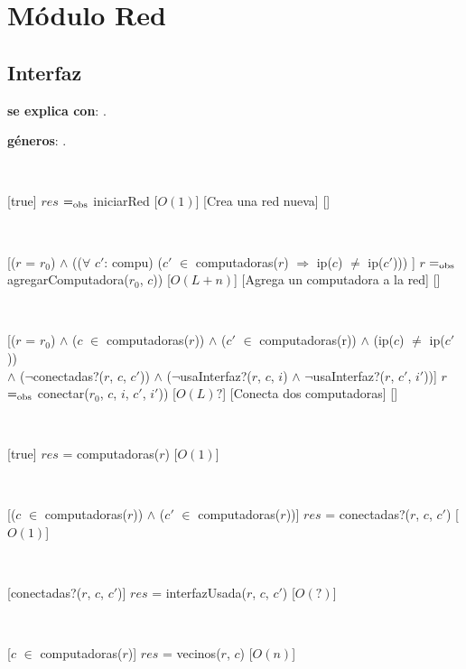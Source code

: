 \section{Módulo Red}

\subsection{Interfaz}

\textbf{se explica con}: .

\textbf{géneros}: .

  ~

  [true]
  {$res$ $=_{\mathrm{obs}}$ iniciarRed}
  [$O(1)$]
  [Crea una red nueva]
  []

  ~

  [($r$ = $r_0$) $\land$ (($\forall$ $c'$: compu) ($c'$ $\in$ computadoras($r$) $\Rightarrow$  ip($c$) $\neq$  ip($c'$)))  ]
  {$r$ $=_{\mathrm{obs}}$ agregarComputadora($r_0$, $c$)) }
  [$O(L + n)$]
  [Agrega un computadora a la red]
  []

  ~

  [($r$ = $r_0$) $\land$ ($c$ $\in$ computadoras($r$)) $\land$ ($c'$ $\in$ computadoras(r)) $\land$ (ip($c$) $\neq$ ip($c'$)) \\
   $\land$ ($\neg$conectadas?($r$, $c$, $c'$)) $\land$ ($\neg$usaInterfaz?($r$, $c$, $i$) $\land$ $\neg$usaInterfaz?($r$, $c'$, $i'$))]
  {$r$ $=_{\mathrm{obs}}$ conectar($r_0$, $c$, $i$, $c'$, $i'$))}
  [$O(L) ?$]
  [Conecta dos computadoras]
  []

  ~

  [true]
  {$res$ = computadoras($r$)}
  [$O(1)$]

  ~

  [($c$ $\in$ computadoras($r$)) $\land$ ($c'$ $\in$ computadoras($r$))]
  {$res$ = conectadas?($r$, $c$, $c'$)}
  [$O(1)$]

  ~

  [conectadas?($r$, $c$, $c'$)]
  {$res$ = interfazUsada($r$, $c$, $c'$)}
  [$O(?)$]

  ~

  [$c$ $\in$ computadoras($r$)]
  {$res$ = vecinos($r$, $c$)}
  [$O(n)$]

